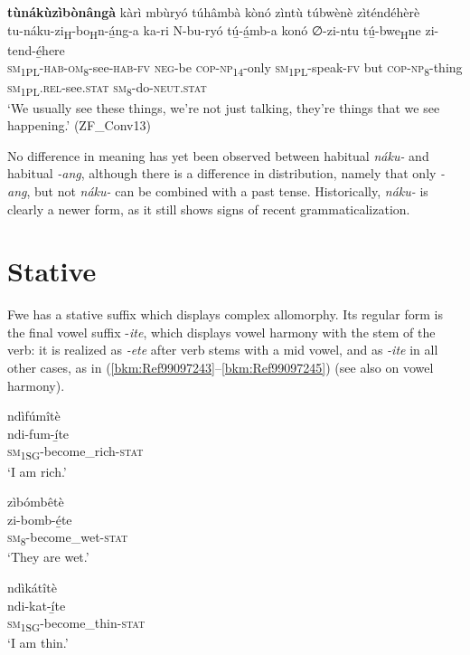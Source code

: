 \ea
\label{bkm:Ref99097108}
\textbf{tùnákùzìbònângà} kàrì mbùryó túhâmbà kònó zìntù túbwènè zìténdéhèrè\\
\gll tu-náku-zi\textsubscript{H}-bo\textsubscript{H}n-á̲ng-a ka-ri    N-bu-ryó    tú̲-á̲mb-a konó  ∅-zi-ntu    tú̲-bwe\textsubscript{H}ne    zi-tend-é̲here\\
\textsc{sm}\textsubscript{1PL}-\textsc{hab}-\textsc{om}\textsubscript{8}-see-\textsc{hab}-\textsc{fv}
\textsc{neg}-be  \textsc{cop}-\textsc{np}\textsubscript{14}-only  \textsc{sm}\textsubscript{1PL}-speak-\textsc{fv}
but  \textsc{cop}-\textsc{np}\textsubscript{8}-thing  \textsc{sm}\textsubscript{1PL}.\textsc{rel}-see.\textsc{stat}   \textsc{sm}\textsubscript{8}-do-\textsc{neut}.\textsc{stat}\\
\glt ‘We usually see these things, we’re not just talking, they’re things that we see happening.’ (ZF\_Conv13)
\z

No difference in meaning has yet been observed between habitual \textit{náku-} and habitual \textit{-ang}, although there is a difference in distribution, namely that only \textit{-ang}, but not \textit{\-náku-} can be combined with a past tense. Historically, \textit{náku-} is clearly a newer form, as it still shows signs of recent grammaticalization.

\section{Stative}
\label{bkm:Ref431984198}\hypertarget{Toc75352696}{}
Fwe has a stative suffix which displays complex allomorphy. Its regular form is the final vowel suffix \--\textit{ite}, which displays vowel harmony with the stem of the verb: it is realized as \textit{-ete} after verb stems with a mid vowel, and as \textit{-ite} in all other cases, as in (\ref{bkm:Ref99097243}--\ref{bkm:Ref99097245}) (see also  on vowel harmony).

\ea
\label{bkm:Ref99097243}
\glll ndìfúmîtè\\
ndi-fum-í̲te\\
\textsc{sm}\textsubscript{1SG}-become\_rich-\textsc{stat}\\
\glt ‘I am rich.’
\z

\ea
\glll zìbómbêtè\\
zi-bomb-é̲te\\
\textsc{sm}\textsubscript{8}-become\_wet-\textsc{stat}\\
\glt ‘They are wet.’
\z

\ea
\glll ndìkátîtè\\
ndi-kat-í̲te\\
\textsc{sm}\textsubscript{1SG}-become\_thin-\textsc{stat}\\
\glt ‘I am thin.’
\z


